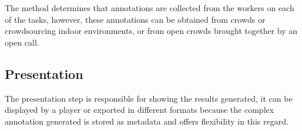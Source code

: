 The method determines that annotations are collected from the workers on each of the tasks, however, these annotations can be obtained from crowds or crowdsourcing indoor environments, or from open crowds brought together by an open call.


\subsection{Presentation} 
The presentation step is responsible for showing the results generated, it can be displayed by a player or exported in different formats because the complex annotation generated is stored as metadata and offers flexibility in this regard.










